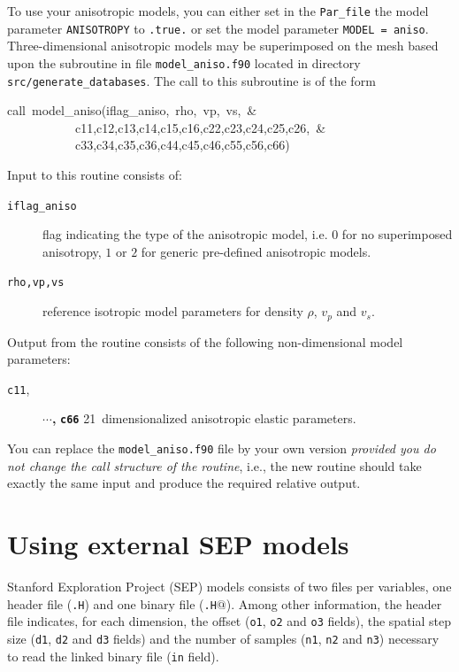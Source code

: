 To use your anisotropic models, you can either set in the \texttt{Par\_file}
the model parameter \texttt{ANISOTROPY} to \texttt{.true.} or set
the model parameter \texttt{MODEL = aniso}. Three-dimensional anisotropic
models may be superimposed on the mesh based upon the subroutine in
file \texttt{model\_aniso.f90} located in directory \texttt{src/generate\_databases}.
The call to this subroutine is of the form
\begin{lyxcode}
call~model\_aniso(iflag\_aniso,~rho,~vp,~vs,~\&~~\\
~~~~~~~~~~~c11,c12,c13,c14,c15,c16,c22,c23,c24,c25,c26,~\&~~\\
~~~~~~~~~~~c33,c34,c35,c36,c44,c45,c46,c55,c56,c66)~
\end{lyxcode}
Input to this routine consists of:
\begin{description}
\item [{\texttt{iflag\_aniso}}] flag indicating the type of the anisotropic
model, i.e. $0$ for no superimposed anisotropy, $1$ or $2$ for
generic pre-defined anisotropic models.
\item [{\texttt{rho,vp,vs}}] reference isotropic model parameters for density
$\rho$, $v_{p}$ and $v_{s}$.
\end{description}
Output from the routine consists of the following non-dimensional
model parameters:
\begin{description}
\item [{\texttt{c11},}] \textbf{$\cdots$,} \texttt{\textbf{c66}} 21~dimensionalized
anisotropic elastic parameters.
\end{description}
You can replace the \texttt{model\_aniso.f90} file by your own version
\textit{provided you do not change the call structure of the routine},
i.e., the new routine should take exactly the same input and produce
the required relative output.



\section{Using external SEP models}\label{sec:Using-SEP}

Stanford Exploration Project (SEP) models consists of two files per variables, one header file (\texttt{.H})
and one binary file (\texttt{.H$@$}).
Among other information, the header file indicates, for each dimension,
the offset (\texttt{o1}, \texttt{o2} and \texttt{o3} fields),
the spatial step size (\texttt{d1}, \texttt{d2} and \texttt{d3} fields)
and the number of samples (\texttt{n1}, \texttt{n2} and \texttt{n3}) necessary to read
the linked binary file (\texttt{in} field).

